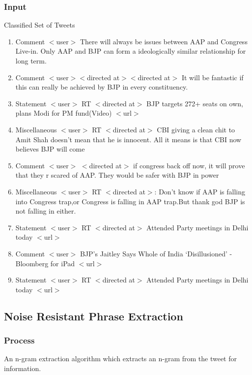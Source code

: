 \documentclass[conference]{IEEEtran}
\begin{document}
\subsubsection{\textbf{Input}}
Classified Set of Tweets
\begin{enumerate}
\item{Comment
$<$user$>$ There will always be issues between AAP and Congress Live-in. Only AAP and BJP can form a ideologically similar relationship for long term.}
\item{Comment
$<$user$>$$<$directed at$>$$<$directed at$>$ It will be fantastic if this can really be achieved by BJP in every constituency. }
\item{Statement
$<$user$>$ RT $<$directed at$>$ BJP targets 272+ seats on own, plans Modi for PM fund(Video) $<$url$>$ }
\item{Miscellaneous
$<$user$>$ RT $<$directed at$>$ CBI giving a clean chit to Amit Shah doesn't mean that he is innocent. All it means is that CBI now believes BJP will come}
\item{Comment
$<$user$>$ $<$directed at$>$ if congress back off now, it will prove that they r scared of AAP. They would be safer with BJP in power}
\item{Miscellaneous
$<$user$>$ RT $<$directed at$>$: Don't know if AAP is falling into Congress trap,or Congress is falling in AAP trap.But thank god BJP is not falling in either.}
\item{Statement
$<$user$>$ RT $<$directed at$>$ Attended Party meetings in Delhi today $<$url$>$ }
\item{Comment
$<$user$>$ BJP's Jaitley Says Whole of India `Disillusioned' - Bloomberg for iPad $<$url$>$}
\item{Statement
$<$user$>$ RT $<$directed at$>$ Attended Party meetings in Delhi today $<$url$>$}

\end{enumerate}
\subsection{\textbf{Noise Resistant Phrase Extraction}}
\subsubsection{\textbf{Process}}
\par An n-gram extraction algorithm which extracts an n-gram from the tweet for information.
\end{document}

